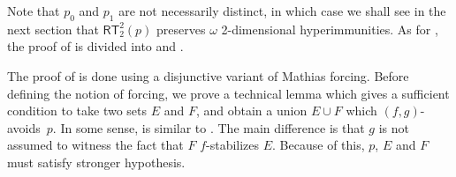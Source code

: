 \documentclass{article}
\def\Hc{\mathcal{H}}
\newcommand{\RT}[0]{\mathsf{RT}}
\newcommand{\NN}[0]{\mathbb{N}}
\def\NN{\mathbb{N}}
\def\Hc{\mathcal{H}}
\newtheorem{theorem}{Theorem}
\numberwithin{theorem}{section}
\theoremstyle{definition}
\begin{document}
Note that $p_0$ and $p_1$ are not necessarily distinct, in which case we shall see in the next section that $\RT^2_2(p)$ preserves $\omega$ 2-dimensional hyperimmunities. As for , the proof of  is divided into  and .


The proof of  is done using a disjunctive variant of Mathias forcing. Before defining the notion of forcing, we prove a technical lemma which gives a sufficient condition to take two sets $E$ and $F$, and obtain a union $E \cup F$ which $(f, g)$-avoids~$p$. In some sense,  is similar to . The main difference is that $g$ is not assumed to witness the fact that $F$ $f$-stabilizes $E$. Because of this, 
$p$, $E$ and $F$ must satisfy stronger hypothesis.
\end{document}
